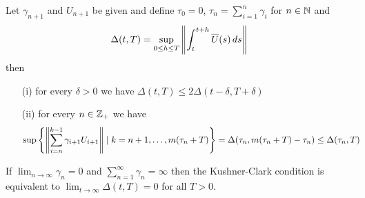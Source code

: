 \begin{prop}\label{KushnerClarkCriterionIntegralForm}Let $\gamma_{n+1}$ and $U_{n+1}$ be given and define $\tau_0=0$, $\tau_n = \sum_{i=1}^n \gamma_i$ for $n \in \mathbb{N}$ and
\begin{align*}
\Delta(t, T) = \sup_{0 \leq h \leq T} \left \lVert \int_t^{t+h} \overline{U}(s) \, ds \right \rVert
\end{align*} 
then 
\begin{itemize}
\item[(i)] for every $\delta>0$ we have $\Delta(t,T) \leq 2 \Delta(t-\delta, T+\delta)$
\item[(ii)] for every $n \in \mathbb{Z}_+$ we have 
\begin{align*}
\sup \left \lbrace \left \lVert \sum_{i=n}^{k-1} \gamma_{i+1} U_{i + 1} \right \rVert \mid k=n+1, \dotsc, m(\tau_n+T) \right \rbrace 
&= \Delta(\tau_n, m(\tau_n+T) - \tau_n) 
\leq \Delta(\tau_n, T)
\end{align*}
\end{itemize}
If $\lim_{n \to \infty} \gamma_n =0$ and $\sum_{n=1}^\infty \gamma_n = \infty$ then the Kushner-Clark condition is equivalent to $\lim_{t \to \infty} \Delta(t,T) = 0$ for all $T > 0$.
\end{prop}
